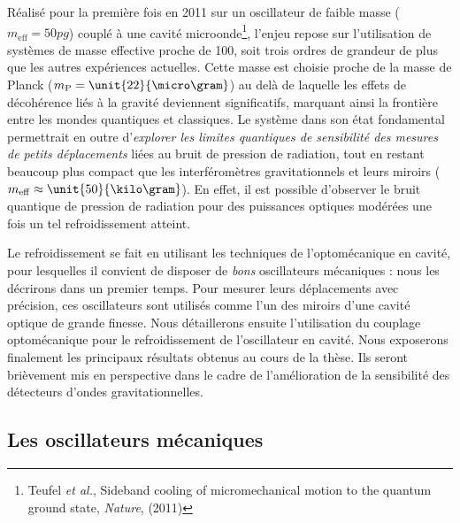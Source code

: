 \documentclass[12pt,a4paper]{article}
\begin{document}
Réalisé pour la première fois en 2011 sur un oscillateur de faible masse ($m_\mathrm{eff} = \unit{50}{pg}$) couplé à une cavité microonde\footnote{Teufel \textit{et al.}, Sideband cooling of micromechanical motion to the quantum ground state, \textit{Nature}, (2011)}, l'enjeu repose sur l'utilisation de systèmes de masse effective proche de \unit{100}{\micro\gram}, soit trois ordres de grandeur de plus que les autres expériences actuelles.
Cette masse est choisie proche de la masse de Planck ($m_\mathrm{P}=\unit{22}{\micro\gram}$) au delà de laquelle les effets de décohérence liés à la gravité deviennent significatifs, marquant ainsi la frontière entre les \og mondes \fg{} quantiques et classiques. 
Le système dans son état fondamental permettrait en outre d'\textit{explorer les limites quantiques de sensibilité des mesures de petits déplacements} liées au bruit de pression de radiation, tout en restant beaucoup plus compact que les interféromètres gravitationnels et leurs miroirs ($m_\mathrm{eff}\approx\unit{50}{\kilo\gram}$).
En effet, il est possible d'observer le bruit quantique de pression de radiation pour des puissances optiques modérées une fois un tel refroidissement atteint.

Le refroidissement se fait en utilisant les techniques de l'optomécanique en cavité, pour lesquelles il convient de disposer de \textit{bons} oscillateurs mécaniques : nous les décrirons dans un premier temps.
Pour mesurer leurs déplacements avec précision, ces oscillateurs sont utilisés comme l'un des miroirs d'une cavité optique de grande finesse.
Nous détaillerons ensuite l'utilisation du couplage optomécanique pour le refroidissement de l'oscillateur en cavité.
Nous exposerons finalement les principaux résultats obtenus au cours de la thèse.
Ils seront brièvement mis en perspective dans le cadre de l'amélioration de la sensibilité des détecteurs d'ondes gravitationnelles.

\subsection{Les oscillateurs mécaniques}
\label{sec:mechanical_oscillators}
\end{document}

